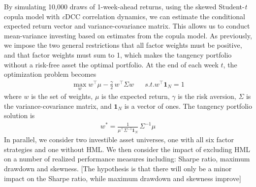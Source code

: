 By simulating 10,000 draws of 1-week-ahead returns, using the skewed Student-\textit{t} copula model with \textit{c}DCC correlation dynamics, we can estimate the conditional expected return vector and variance-covariance matrix. This allows us to conduct mean-variance investing based on estimates from the copula model. As previously, we impose the two general restrictions that all factor weights must be positive, and that factor weights must sum to 1, which makes the tangency portfolio without a risk-free asset the optimal portfolio. At the end of each week $t$, the optimization problem becomes
\begin{align}
    \max_{w} w^\top \mu - \frac{\gamma}{2}\,w^\top \Sigma w && s.t. w^\top \mathbf{1}_N = 1
\end{align}
where $w$ is the set of weights, $\mu$ is the expected return, $\gamma$ is the risk aversion, $\Sigma$ is the variance-covariance matrix, and $\mathbf{1}_N$ is a vector of ones. The tangency portfolio solution is
\begin{align}
    w^* = \frac{1}{\mu^\top \Sigma^{-1} \mathbf{1}_N} \, \Sigma^{-1} \mu
\end{align}
In parallel, we consider two investible asset universes, one with all six factor strategies and one without HML. We then consider the impact of excluding HML on a number of realized performance measures including: Sharpe ratio, maximum drawdown and skewness. [The hypothesis is that there will only be a minor impact on the Sharpe ratio, while maximum drawdown and skewness improve]
